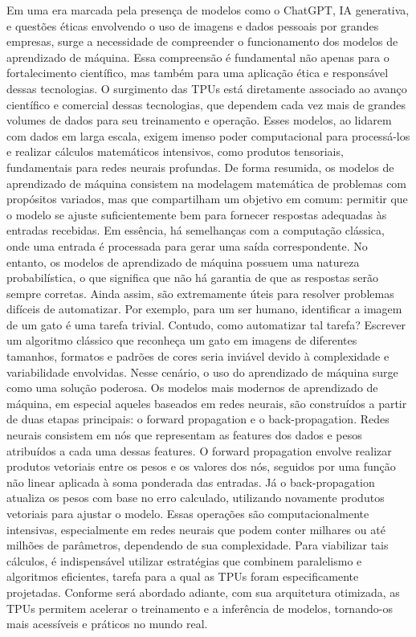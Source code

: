\documentclass{report}
\begin{document}
Em uma era marcada pela presença de modelos como o ChatGPT, IA generativa, e questões éticas envolvendo o uso de imagens e dados pessoais por grandes empresas, surge a necessidade de compreender o funcionamento dos modelos de aprendizado de máquina. Essa compreensão é fundamental não apenas para o fortalecimento científico, mas também para uma aplicação ética e responsável dessas tecnologias.
O surgimento das TPUs está diretamente associado ao avanço científico e comercial dessas tecnologias, que dependem cada vez mais de grandes volumes de dados para seu treinamento e operação. Esses modelos, ao lidarem com dados em larga escala, exigem imenso poder computacional para processá-los e realizar cálculos matemáticos intensivos, como produtos tensoriais, fundamentais para redes neurais profundas.
De forma resumida, os modelos de aprendizado de máquina consistem na modelagem matemática de problemas com propósitos variados, mas que compartilham um objetivo em comum: permitir que o modelo se ajuste suficientemente bem para fornecer respostas adequadas às entradas recebidas. Em essência, há semelhanças com a computação clássica, onde uma entrada é processada para gerar uma saída correspondente. No entanto, os modelos de aprendizado de máquina possuem uma natureza probabilística, o que significa que não há garantia de que as respostas serão sempre corretas. Ainda assim, são extremamente úteis para resolver problemas difíceis de automatizar.
Por exemplo, para um ser humano, identificar a imagem de um gato é uma tarefa trivial. Contudo, como automatizar tal tarefa? Escrever um algoritmo clássico que reconheça um gato em imagens de diferentes tamanhos, formatos e padrões de cores seria inviável devido à complexidade e variabilidade envolvidas. Nesse cenário, o uso do aprendizado de máquina surge como uma solução poderosa.
Os modelos mais modernos de aprendizado de máquina, em especial aqueles baseados em redes neurais, são construídos a partir de duas etapas principais: o forward propagation e o back-propagation. Redes neurais consistem em nós que representam as features dos dados e pesos atribuídos a cada uma dessas features. O forward propagation envolve realizar produtos vetoriais entre os pesos e os valores dos nós, seguidos por uma função não linear aplicada à soma ponderada das entradas. Já o back-propagation atualiza os pesos com base no erro calculado, utilizando novamente produtos vetoriais para ajustar o modelo.
Essas operações são computacionalmente intensivas, especialmente em redes neurais que podem conter milhares ou até milhões de parâmetros, dependendo de sua complexidade. Para viabilizar tais cálculos, é indispensável utilizar estratégias que combinem paralelismo e algoritmos eficientes, tarefa para a qual as TPUs foram especificamente projetadas. Conforme será abordado adiante, com sua arquitetura otimizada, as TPUs permitem acelerar o treinamento e a inferência de modelos, tornando-os mais acessíveis e práticos no mundo real.
\end{document}
